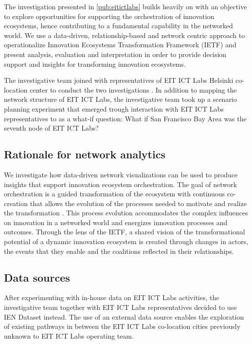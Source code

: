 The investigation presented in \ref{pub:eitictlabs} builds heavily on \cite{Still2012ParadigmDigital} with an objective to explore opportunities for supporting the orchestration of innovation ecosystems, hence contributing to a fundamental capability in the networked world. We use a data-driven, relationship-based and network centric approach to operationalize Innovation Ecosystems Transformation Framework (IETF) \citep{Russell2011TransformingOrchestration} and present analysis, evaluation and interpretation in order to provide decision support and insights for transforming innovation ecosystems.

The investigative team joined with representatives of EIT ICT Labs Helsinki co-location center to conduct the two investigations \citep{Still2012ParadigmDigital, Still2014InsightsVisualisations}. In addition to mapping the network structure of EIT ICT Labs, the investigative team took up a scenario planning experiment that emerged trough interaction with EIT ICT Labs representatives to as a what-if question: What if San Francisco Bay Area was the seventh node of EIT ICT Labs? 

\subsection{Rationale for network analytics}

We investigate how data-driven network visualizations can be used to produce insights that support innovation ecosystem orchestration. The goal of network orchestration is a guided transformation of the ecosystem with continuous co-creation that allows the evolution of the processes needed to motivate and realize the transformation \citep{Russell2011TransformingOrchestration}. This process evolution accommodates the complex influences on innovation in a networked world and energizes innovation processes and outcomes. Through the lens of the IETF, a shared vision of the transformational potential of a dynamic innovation ecosystem is created through changes in actors, the events that they enable and the coalitions reflected in their relationships.

\subsection{Data sources}

After experimenting with in-house data on EIT ICT Labs activities, the investigative team together with EIT ICT Labs representatives decided to use IEN Dataset instead. The use of an external data source enables the  exploration of existing pathways in between the EIT ICT Labs co-location cities previously unknown to EIT ICT Labs operating team.

